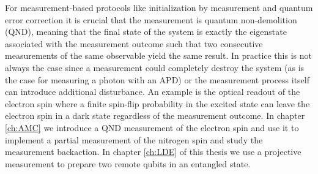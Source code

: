 For measurement-based protocols like initialization by measurement and quantum error correction\cite{Devoret_Science_2013} it is crucial that the measurement is quantum non-demolition (QND)\cite{Braginsky_Science_1980}, meaning that the final state of the system is exactly the eigenstate associated with the measurement outcome such that two consecutive measurements of the same observable yield the same result. In practice this is not always the case since a measurement could completely destroy the system (as is the case for measuring a photon with an APD) or the measurement process itself can introduce additional disturbance. An example is the optical readout of the electron spin where a finite spin-flip probability in the excited state can leave the electron spin in a dark state regardless of the measurement outcome. In chapter \ref{ch:AMC} we introduce a QND measurement of the electron spin and use it to implement a partial measurement of the nitrogen spin and study the measurement backaction. In chapter \ref{ch:LDE} of this thesis we use a projective measurement to prepare two remote qubits in an entangled state.

\newpage




